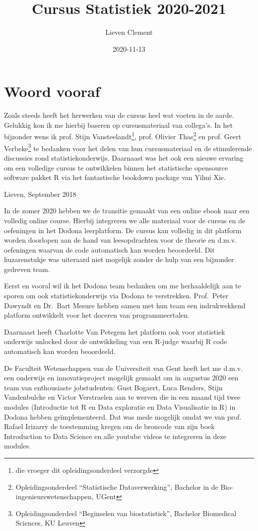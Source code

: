 \documentclass[
  12pt,dutch,coursenotes]{book}
\title{Cursus Statistiek 2020-2021}
\author{Lieven Clement}
\date{2020-11-13}
\theoremstyle{definition}
\theoremstyle{definition}
\theoremstyle{definition}
\theoremstyle{remark}
\begin{document}
\maketitle

{
\setcounter{tocdepth}{1}
\tableofcontents
}
\hypertarget{woord-vooraf}{%
\chapter*{Woord vooraf}\label{woord-vooraf}}

Zoals steeds heeft het herwerken van de cursus heel wat voeten in de aarde. Gelukkig kon ik me hierbij baseren op cursusmateriaal van collega's. In het bijzonder wens ik prof. Stijn Vansteelandt\footnote{die vroeger dit opleidingsonderdeel verzorgde}, prof. Olivier Thas\footnote{Opleidingsonderdeel ``Statistische Dataverwerking'', Bachelor in de Bio-ingenieurswetenschappen, UGent} en prof. Geert Verbeke\footnote{Opleidingsonderdeel ``Beginselen van biostatistiek'', Bachelor Biomedical Sciences, KU Leuven} te bedanken voor het delen van hun cursusmateriaal en de stimulerende discussies rond statistiekonderwijs. Daarnaast was het ook een nieuwe ervaring om een volledige cursus te ontwikkelen binnen het statistische opensource software pakket R via het fantastische bookdown package van Yihui Xie.

Lieven, September 2018

In de zomer 2020 hebben we de transitie gemaakt van een online ebook naar een volledig online course.
Hierbij integreren we alle materiaal voor de cursus en de oefeningen in het Dodona leerplatform.
De cursus kan volledig in dit platform worden doorlopen aan de hand van leesopdrachten voor de theorie en d.m.v. oefeningen waarvan de code automatisch kan worden beoordeeld.
Dit huzarenstukje was uiteraard niet mogelijk zonder de hulp van een bijzonder gedreven team.

Eerst en vooral wil ik het Dodona team bedanken om me herhaaldelijk aan te sporen om ook statistiekonderwijs via Dodona te verstrekken. Prof.~Peter Dawyndt en Dr.~Bart Mesure hebben samen met hun team een indrukwekkend platform ontwikkelt voor het doceren van programmeertalen.

Daarnaast heeft Charlotte Van Petegem het platform ook voor statistiek onderwijs unlocked door de ontwikkeling van een R-judge waarbij R code automatisch kan worden beoordeeld.

De Faculteit Wetenschappen van de Universiteit van Gent heeft het me d.m.v. een onderwijs en innovatieproject mogelijk gemaakt om in augustus 2020 een team van enthousiaste jobstudenten: Gust Bogaert, Luca Renders, Stijn Vandenbulcke en Victor Verstraelen aan te werven die in een maand tijd twee modules (Introductie tot R en Data exploratie en Data Visualisatie in R) in Dodona hebben geïmplementeerd. Dat was mede mogelijk omdat we van prof. Rafael Irizarry de toestemming kregen om de broncode van zijn boek Introduction to Data Science en alle youtube videos te integreren in deze modules.
\end{document}
